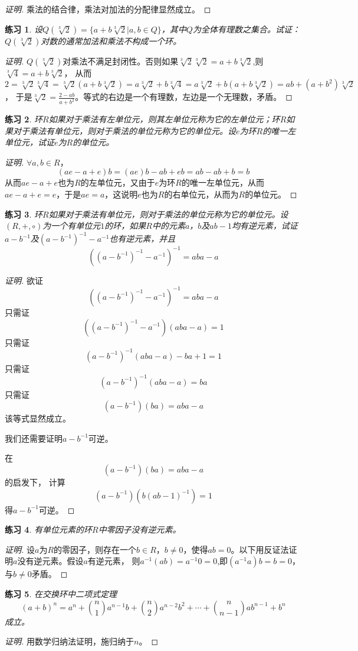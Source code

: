 \documentclass{article}
\newtheorem{Exercise}{练习}
\begin{document}
\begin{CJK*}{UTF8}{gbsn}
\begin{proof}[证明]
  乘法的结合律，乘法对加法的分配律显然成立。
\end{proof}
\begin{Exercise}
  设$Q(\sqrt[3]{2})=\{a+b\sqrt[3]{2}|a,b\in Q\}$，其中$Q$为全体有理数之集合。试证：$Q(\sqrt[3]{2})$对数的通常加法和乘法不构成一个环。
\end{Exercise}
\begin{proof}[证明]
  $Q(\sqrt[3]{2})$对乘法不满足封闭性。否则如果$\sqrt[3]{2}\sqrt[3]{2}=a+b\sqrt[3]{2}$,则$\sqrt[3]{4}=a+b\sqrt[3]{2}$，
  从而$2=\sqrt[3]{2}\sqrt[3]{4}=\sqrt[3]{2}(a+b\sqrt[3]{2})=a\sqrt[3]{2}+b\sqrt[3]{4}=a\sqrt[3]{2}+b(a+b\sqrt[3]{2})=ab+(a+b^2)\sqrt[3]{2}$，
  于是$\sqrt[3]{2}=\frac{2-ab}{a+b^2}$。等式的右边是一个有理数，左边是一个无理数，矛盾。
\end{proof}
\begin{Exercise}
  环$R$如果对于乘法有左单位元，则其左单位元称为它的左单位元；环$R$如果对于乘法有单位元，则对于乘法的单位元称为它的单位元。设$e$为环$R$的唯一左单位元，试证$e$为$R$的单位元。
\end{Exercise}
\begin{proof}[证明]
  $\forall a,b\in R$，
  \[(ae-a+e)b=(ae)b-ab+eb=ab-ab+b=b\]
  从而$ae-a+e$也为$R$的左单位元，又由于$e$为环$R$的唯一左单位元，从而$ae-a+e=e$，于是$ae=a$，这说明$e$也为$R$的右单位元，从而为$R$的单位元。
\end{proof}
\begin{Exercise}
  环$R$如果对于乘法有单位元，则对于乘法的单位元称为它的单位元。设$(R,+,\circ)$为一个有单位元$1$的环，如果$R$中的元素$a$，$b$及$ab-1$均有逆元素，试证$a-b^{-1}$及$(a-b^{-1})^{-1}-a^{-1}$也有逆元素，并且
\[((a-b^{-1})^{-1}-a^{-1})^{-1}=aba-a\]
\end{Exercise}
\begin{proof}[证明]
  欲证
  \[((a-b^{-1})^{-1}-a^{-1})^{-1}=aba-a\]
  只需证
  \[((a-b^{-1})^{-1}-a^{-1})(aba-a)=1\]
  只需证
  \[(a-b^{-1})^{-1}(aba-a)-ba+1=1\]
  只需证
  \[(a-b^{-1})^{-1}(aba-a)=ba\]
  只需证
  \[(a-b^{-1})(ba)=aba-a\]
  该等式显然成立。

  我们还需要证明$a-b^{-1}$可逆。

  在
  \[(a-b^{-1})(ba)=aba-a\]
  的启发下，
  计算
  \[(a-b^{-1})(b(ab-1)^{-1})=1\]
  得$a-b^{-1}$可逆。

\end{proof}
\begin{Exercise}
  有单位元素的环$R$中零因子没有逆元素。
\end{Exercise}
\begin{proof}[证明]
  设$a$为$R$的零因子，则存在一个$b\in R$，$b\neq 0$，使得$ab=0$。以下用反证法证明$a$没有逆元素。假设$a$有逆元素，
  则$a^{-1}(ab)=a^{-1}0=0$,即$(a^{-1}a)b=b=0$，与$b\neq 0$矛盾。
\end{proof}
\begin{Exercise}
  在交换环中二项式定理
\[(a+b)^n=a^n+\binom{n}{1}a^{n-1}b+\binom{n}{2}a^{n-2}b^2+\cdots+\binom{n}{n-1}ab^{n-1}+b^n\]
  成立。
\end{Exercise}
\begin{proof}[证明]
用数学归纳法证明，施归纳于$n$。


\end{proof}
\end{CJK*}
\end{document}
